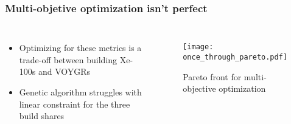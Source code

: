 \begin{frame}
    \frametitle{Multi-objetive optimization isn't perfect}
    \begin{columns}
        \column[t]{5cm}
        \begin{itemize}
            \item Optimizing for these metrics is a trade-off between 
                 building Xe-100s and VOYGRs
            \item<2-> Genetic algorithm struggles with linear constraint for 
                  the three build shares
        \end{itemize}

        \column[t]{5cm}
        \begin{figure}
            \centering 
            \texttt{[image: once\_through\_pareto.pdf]}
            \caption{Pareto front for multi-objective optimization}
            \label{fig:pareto}
        \end{figure}
    \end{columns}
    
\end{frame}